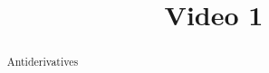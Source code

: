 \documentclass[handout]{ximera}
\title{Video 1}
\begin{document}
\begin{abstract}
Antiderivatives
\end{abstract}

\maketitle

\end{document}
